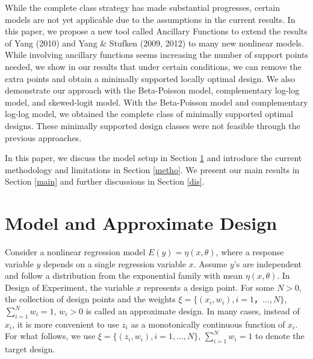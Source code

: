 \documentclass[12pt]{TD-CJS}
\begin{document}

While the complete class strategy has made substantial progresses, certain models are not yet applicable due to the assumptions in the current results. In this paper, we propose a new tool called Ancillary Functions to extend the results of Yang (2010) and Yang \& Stufken (2009, 2012) to many new nonlinear models. While involving ancillary functions seems increasing the number of support points needed, we show in our results that under certain conditions, we can remove the extra points and obtain a minimally supported locally optimal design. We also demonstrate our approach with the Beta-Poisson model, complementary log-log model, and skewed-logit model. With the Beta-Poisson model and complementary log-log model, we obtained the complete class of minimally supported optimal designs. These minimally supported design classes were not feasible through the previous approaches.  
 
In this paper, we discuss the model setup in Section \ref{2} and introduce the current methodology and limitations in Section \ref{metho}. We present our main results in Section \ref{main} and further discussions in Section \ref{dis}. 

\section{Model and Approximate Design}\label{2}
Consider a nonlinear regression model $ E(y) = \eta(x,\theta)$, where a response variable $y$ depends on a single regression variable $x$. Assume $y$'s are independent and follow a distribution from the exponential family with mean  $\eta(x,\theta)$. In Design of Experiment, the variable $x$ represents a design point. For some $N>0$, the collection of design points and the weights $\xi = \{(x_i,w_i), i=1， \ldots,
N\}$, $\sum_{i=1}^Nw_i = 1$, $w_i> 0$ is called an approximate design. In many cases, instead of $x_i$, it is more convenient to use $z_i$ as a monotonically continuous function of $x_i$. For what follows, we use $\xi = \{(z_i,w_i), i=1, \ldots,N\}$, $\sum_{i=1}^Nw_i = 1$ to denote the target design. 
\end{document}
